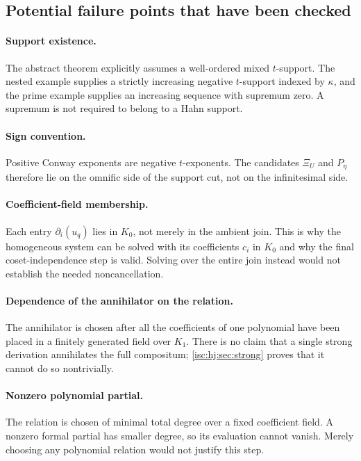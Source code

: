 \documentclass[11pt,letterpaper]{article}
\theoremstyle{definition}
\theoremstyle{remark}
\numberwithin{equation}{section}
\begin{document}
\subsection{Potential failure points that have been checked}

\paragraph{Support existence.}
The abstract theorem explicitly assumes a well-ordered mixed
$t$-support. The nested example supplies a strictly increasing negative
$t$-support indexed by $\kappa$, and the prime example supplies an
increasing sequence with supremum zero. A supremum is not required to
belong to a Hahn support.

\paragraph{Sign convention.}
Positive Conway exponents are negative $t$-exponents. The candidates
$\Xi_U$ and $P_\eta$ therefore lie on the omnific side of the support
cut, not on the infinitesimal side.

\paragraph{Coefficient-field membership.}
Each entry $\partial_i(u_q)$ lies in $K_0$, not merely in the ambient join.
This is why the homogeneous system can be solved with its coefficients
$c_i$ in $K_0$ and why the final coset-independence step is valid.
Solving over the entire join instead would not establish the needed
noncancellation.

\paragraph{Dependence of the annihilator on the relation.}
The annihilator is chosen after all the coefficients of one polynomial
have been placed in a finitely generated field over $K_1$.
There is no claim that a single strong derivation annihilates the full
compositum; \cref{isc:hj:sec:strong} proves that it cannot do so
nontrivially.

\paragraph{Nonzero polynomial partial.}
The relation is chosen of minimal total degree over a fixed coefficient
field. A nonzero formal partial has smaller degree, so its evaluation
cannot vanish. Merely choosing any polynomial relation would not
justify this step.
\end{document}
